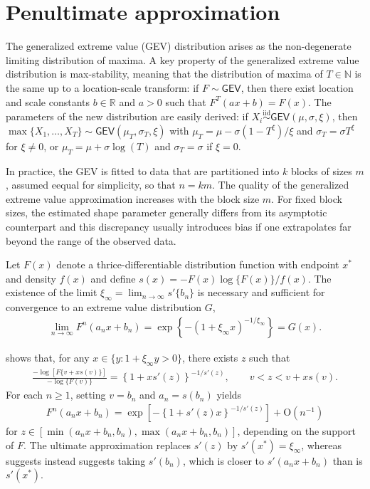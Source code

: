 \documentclass[]{book}
\begin{document}
\hypertarget{penultimate-approximation}{%
\chapter{Penultimate approximation}\label{penultimate-approximation}}

The generalized extreme value (GEV) distribution arises as the non-degenerate limiting distribution of maxima. A key property of the generalized extreme value distribution is max-stability, meaning that the distribution of maxima of \(T \in \mathbb{N}\) is the same up to a location-scale transform: if \(F \sim \mathsf{GEV}\), then there exist location and scale constants \(b \in \mathbb{R}\) and \(a>0\) such that \(F^T(ax+b) = F(x)\). The parameters of the new distribution are easily derived: if \(X_i \stackrel{\mathrm{iid}}{\sim}\mathsf{GEV}(\mu,\sigma, \xi)\), then \(\max\{X_1, \ldots, X_T\} \sim \mathsf{GEV}(\mu_T, \sigma_T, \xi)\) with \(\mu_T = \mu - \sigma(1-T^\xi)/\xi\) and \(\sigma_T = \sigma T^\xi\) for \(\xi \neq 0\), or \(\mu_T = \mu +\sigma \log(T)\) and \(\sigma_T = \sigma\) if \(\xi=0\).

In practice, the GEV is fitted to data that are partitioned into \(k\) blocks of sizes \(m\), assumed eequal for simplicity, so that \(n = km\). The quality of the generalized extreme value approximation increases with the block size \(m\). For fixed block sizes, the estimated shape parameter generally differs from its asymptotic counterpart and this discrepancy usually introduces bias if one extrapolates far beyond the range of the observed data.

Let \(F(x)\) denote a thrice-differentiable distribution function with endpoint \(x^*\) and density \(f(x)\) and define \(s(x)=-F(x)\log\{F(x)\}/f(x)\). The existence of the limit \(\xi_{\infty} = \lim_{n \to \infty} s'\{b_n\}\) is necessary and sufficient for convergence to an extreme value distribution \(G\),
\begin{align*}
 \lim_{n \to \infty} F^n(a_nx+b_n) = \exp\left\{-(1+\xi_\infty x)^{-1/\xi_\infty}\right\}=G(x).
\end{align*}

\citet{Smith:1987} shows that, for any \(x \in \{y:1+\xi_\infty y >0\}\), there exists \(z\) such that
\begin{align*}
   \frac{-\log[F\{v+xs(v)\}]}{-\log\{F(v)\}} = \left\{1+xs'(z)\right\}^{-1/s'(z)}, \qquad v < z < v+xs(v).
\end{align*}
For each \(n \geq 1\), setting \(v=b_n\) and \(a_n=s(b_n)\) yields
\begin{align*}
   F^n(a_nx+b_n)=\exp\left[-\left\{1+s'(z)x\right\}^{-1/s'(z)}\right] + \mathrm{O}(n^{-1})
\end{align*}
for \(z \in [\min(a_nx+b_n, b_n), \max(a_nx+b_n, b_n)]\), depending on the support of \(F\). The ultimate approximation replaces \(s'(z)\) by \(s'(x^*)=\xi_{\infty}\), whereas \citet{Smith:1987} suggests instead suggests taking \(s'(b_n)\), which is closer to \(s'(a_nx+b_n)\) than is \(s'(x^*)\).
\end{document}
